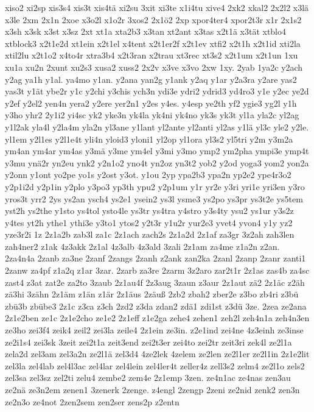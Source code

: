 {xiso2
xi2sp
xis3s4
xis3t
xis4tä
xi2su
3xit
xi3te
x1i4tu
xive4
2xk2
xkal2
2x2l2
x3lä
x3le
2xm
2x1n
2xoe
x3o2l
x1o2r
3xos2
2x1ö2
2xp
xpor4ter4
xpor2t3r
x1r
2x1s2
x3sh
x3sk
x3st
x3sz
2xt
xt1a
xta2b3
x3tan
xt2ant
x3tas
x2t1ä
x3tät
xtblo4
xtblock3
x2t1e2d
xt1ein
x2t1el
x4tent
x2t1er2f
x2t1ev
xtfi2
x2t1h
x2t1id
xti2la
xtil2lu
x2t1o2
x4to4r
xtra3b4
x2t3ran
x2trau
xt3rec
xt3s2
x2t1um
x2t1un
1xu
xu1a
xu2n
2xunt
xu2s3
xusa2
xuss2
2x2v
x3ve
x3vo
2xw
1xy.
2yab
1ya2c
y2ach
y2ag
ya1h
y1al.
ya4mo
y1an.
y2ana
yan2g
y1ank
y2aq
y1ar
y2a3ra
y2are
yas2
yas3t
y1ät
ybe2r
y1c
y2chi
y3chis
ych3n
ydi3e
ydri2
ydrid3
yd4ro3
y1e
y2ec
ye2d
y2ef
y2el2
yen4n
yera2
y2ere
yer2n1
y2es
y4es.
y4esp
ye2th
yf2
ygie3
yg2l
y1h
y3ho
yhr2
2y1i2
yi4sc
yk2
yke3n
yk4la
yk4ni
yk4no
yk3s
yk3t
yl1a
yla2c
yl2ag
y1l2ak
yla4l
y2la4m
yla2n
yl3ane
y1lant
yl2ante
yl2anti
yl2as
y1lä
yl3c
yle2
y2le.
yl1em
y2l1es
y2l1e4t
yli4n
yloid3
yloni1
yl2op
yl1ora
yl3s2
yl5tri
y2m
y3m2a
ym4an
ym4ar
ym4as
y3mä
y3me
ym4el
y3mi
y3mo
ymp2
ym2pha
ympi3e
ymp4t
y3mu
ynä2r
yn2eu
ynk2
y2n1o2
yno4t
yn2oz
yn3t2
yob2
y2od
yoga3
yom2
yon2a
y2onn
y1ont
yo2pe
yo1s
y2ost
y3ot.
y1ou
2yp
ypa2b3
ypa2n
yp2e2
ype4r3o2
y2p1i2d
y2p1in
y2plo
y3po3
yp3th
ypu2
y2p1um
y1r
yr2e
y3ri
yri1e
yri3en
y3ro
yros3t
yrr2
2ys
ys2an
ysch4
ys2e1
ysein2
ys3l
ysme3
ys2po
ys3pr
ys3t2e
ys5tem
yst2h
ys2the
y1sto
ys4tol
ysto4le
ys3tr
ys4tra
y4stro
y3s4ty
ysu2
ys1ur
y3s2z
y4tes
yt2h
ythe1
ythi3e
y3to1
ytos2
y2t3r
y1u2r
yur2e3
yvet4
yvon4
y1y
yz2
yze3r2i
1z
2z1a2b
zab3l
za1c
2z1ach
zach2s
2z1a2d
2z1af
za3gr
3z2ah
zah3len
zah4ner2
z1ak
4z3akk
2z1al
4z3alb
4z3ald
3zali
2z1am
za4me
z1a2n
z2an.
2za4n4a
2zanb
za3ne
2zanf
2zangs
2zanh
z2ank
zan2ka
2zanl
2zanp
2zanr
zanti1
2zanw
za4pf
z1a2q
z1ar
3zar.
2zarb
za3re
2zarm
3z2aro
zar2t1r
2z1as
zas4b
za4sc
zast4
z3at
zat2e
za2to
3zaub
2z1au4f
2z3aug
3zaun
z3aur
2z1aut
zä2
2z1äc
z2äh
zä3hi
3zähn
2z1äm
z1än
z1är
2z1äus
2zäuß
2zb2
zbah2
zber2e
z3bo
zb4ri
z3bü
zbü3b
zbübe3
2z1c
z3ca
z3ch
2zd2
z3da
zdan2
zdä1
zdi1st
z3dü
3ze.
2zea
ze2ana
2z1e2ben
ze1c
2z1e2cho
ze1e2
2z1eff
z1e2ga
zehe4
zehen1
zeh2l
zeh4n1a
zeh4n3en
ze3ho
zei3f4
zeik4
zeil2
zei3la
zeile4
2z1ein
ze3in.
z2e1ind
zei4ne
4z3einh
ze3inse
ze2i1s4
zei3sk
3zeit
zei2t1a
zeit3end
zei2t3er
zei4to
zei2tr
zeit3ri
zek4l
ze2l1a
zela2d
zel3am
zel3a2n
ze2l1ä
zel3d4
4ze2lek
4zelem
ze2len
ze2l1er
ze2l1in
2z1e2lit
zel3la
zel4lab
zel4l3ac
zel4lar
zel4lein
zel4ler4t
zeller4z
zell3s2
zelm4
ze2l1o
zels2
zel3sa
zel3sz
zel2ti
zelu4
zembe2
zem4e
2z1emp
3zen.
ze4n1ac
ze4nas
zen3au
ze2nä
ze3n2em
zenen1
3zenerk
2zenge.
z4engl
2zengp
2zeni
ze2nid
zenk2
zen3n
ze2n3o
ze4not
2zen2sem
zen2ser
zens2p
z2entn
}
